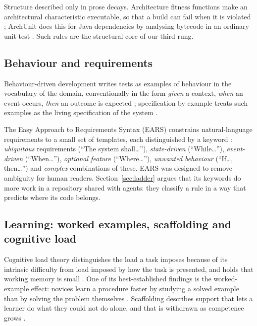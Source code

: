 Structure described only in prose decays. Architecture fitness functions make an
architectural characteristic executable, so that a build can fail when it is violated
\citep{ford2017evolutionary}; ArchUnit does this for Java dependencies by analysing bytecode in
an ordinary unit test \citep{archunit}. Such rules are the structural core of our third rung.

\subsection{Behaviour and requirements}

Behaviour-driven development writes tests as examples of behaviour in the vocabulary of the
domain, conventionally in the form \emph{given} a context, \emph{when} an event occurs,
\emph{then} an outcome is expected \citep{north2006bdd}; specification by example treats such
examples as the living specification of the system \citep{adzic2011sbe}.

The Easy Approach to Requirements Syntax (EARS) constrains natural-language requirements to a
small set of templates, each distinguished by a keyword \citep{mavin2009ears}:
\emph{ubiquitous} requirements (``The system shall\ldots''), \emph{state-driven}
(``While\ldots''), \emph{event-driven} (``When\ldots''), \emph{optional feature}
(``Where\ldots''), \emph{unwanted behaviour} (``If\ldots, then\ldots'') and \emph{complex}
combinations of these. EARS was designed to remove ambiguity for human readers. Section~\ref{sec:ladder}
argues that its keywords do more work in a repository shared with agents: they classify a rule
in a way that predicts where its code belongs.

\subsection{Learning: worked examples, scaffolding and cognitive load}

Cognitive load theory distinguishes the load a task imposes because of its intrinsic difficulty
from load imposed by how the task is presented, and holds that working memory is small
\citep{sweller1988cognitive}. One of its best-established findings is the worked-example
effect: novices learn a procedure faster by studying a solved example than by solving the
problem themselves \citep{sweller1985worked}. Scaffolding describes support that lets a learner
do what they could not do alone, and that is withdrawn as competence grows \citep{wood1976scaffolding}.


